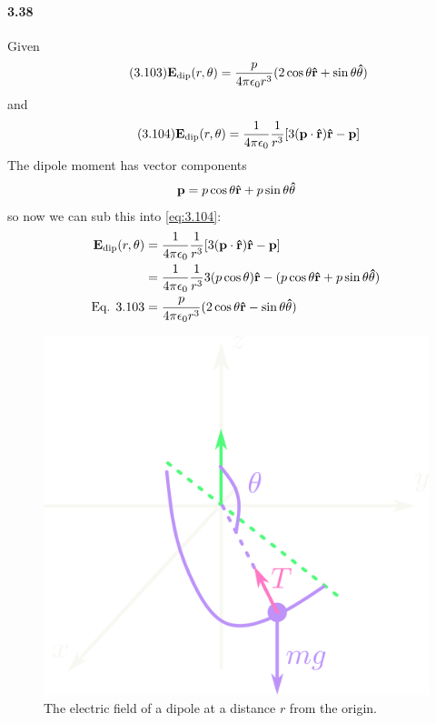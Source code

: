 \documentclass[../main.tex]{subfiles}
\begin{document}
\paragraph{3.38} Given
\begin{align*}\tag{3.103} \label{eq:3.103}
    \vb E_\text{dip} (r,\theta) = \frac{p}{4\pi\epsilon_0 r^3} (2\cos\theta \vu{r} + \sin\theta \vu{\theta})
\end{align*}
and
\begin{align*}\tag{3.104} \label{eq:3.104}
    \vb E_\text{dip} (r,\theta) = \frac{1}{4\pi\epsilon_0} \frac{1}{r^3} [3(\vb p \cdot \vu r) \vu r - \vb p]
\end{align*}
The dipole moment has vector components
\begin{align*}
    \vb p = p \cos\theta \vu r + p \sin\theta \vu\theta
\end{align*}
so now we can sub this into \eqref{eq:3.104}:
\begin{align*}
    \vb E_\text{dip} (r,\theta) &= \frac{1}{4\pi\epsilon_0} \frac{1}{r^3} [3(\vb p \cdot \vu r) \vu r - \vb p] \\
    &= \frac{1}{4\pi\epsilon_0} \frac{1}{r^3} 3(p \cos\theta) \vu r - (p \cos\theta \vu r + p \sin\theta \vu\theta) \\
    \textrm{Eq. 3.103} &= \frac{p}{4\pi \epsilon_0 r^3} (2 \cos\theta \vu r - \sin\theta \vu\theta)
\end{align*}

\newpage
\begin{figure}[ht]
    \centering
    \includegraphics[width=0.5\linewidth]{hw4.png}
    \caption{The electric field of a dipole at a distance $r$ from the origin.}
    \label{fig:hw5_3_38}
\end{figure}
\end{document}
